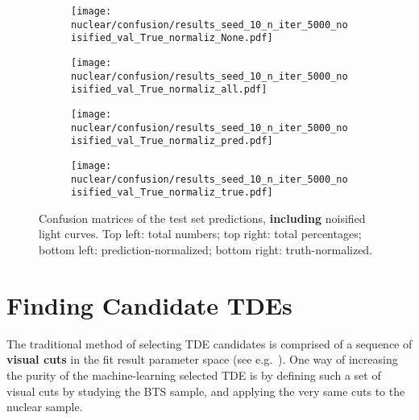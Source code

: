 \begin{figure}[htb]
  \centering
  \begin{subfigure}[b]{0.49\textwidth}
    \centering
    \texttt{[image: nuclear/confusion/results\_seed\_10\_n\_iter\_5000\_noisified\_val\_True\_normaliz\_None.pdf]}
  \end{subfigure}
  \begin{subfigure}[b]{0.49\textwidth}
    \centering
    \texttt{[image: nuclear/confusion/results\_seed\_10\_n\_iter\_5000\_noisified\_val\_True\_normaliz\_all.pdf]}
  \end{subfigure}
  \begin{subfigure}[b]{0.49\textwidth}
    \centering
    \texttt{[image: nuclear/confusion/results\_seed\_10\_n\_iter\_5000\_noisified\_val\_True\_normaliz\_pred.pdf]}
  \end{subfigure}
  \begin{subfigure}[b]{0.49\textwidth}
    \centering
    \texttt{[image: nuclear/confusion/results\_seed\_10\_n\_iter\_5000\_noisified\_val\_True\_normaliz\_true.pdf]}
  \end{subfigure}
  \caption[Confusion matrices with augmentation]{Confusion matrices of the test set predictions, \textbf{including} noisified light curves. Top left: total numbers; top right: total percentages; bottom left: prediction-normalized; bottom right: truth-normalized.}
\end{figure}




\section{Finding Candidate TDEs}\label{visual_cuts}

The traditional method of selecting TDE candidates is comprised of a sequence of \textbf{visual cuts} in the fit result parameter space (see e.g.~\cite{Velzen2019}). One way of increasing the purity of the machine-learning selected TDE is by defining such a set of visual cuts by studying the BTS sample, and applying the very same cuts to the nuclear sample.

